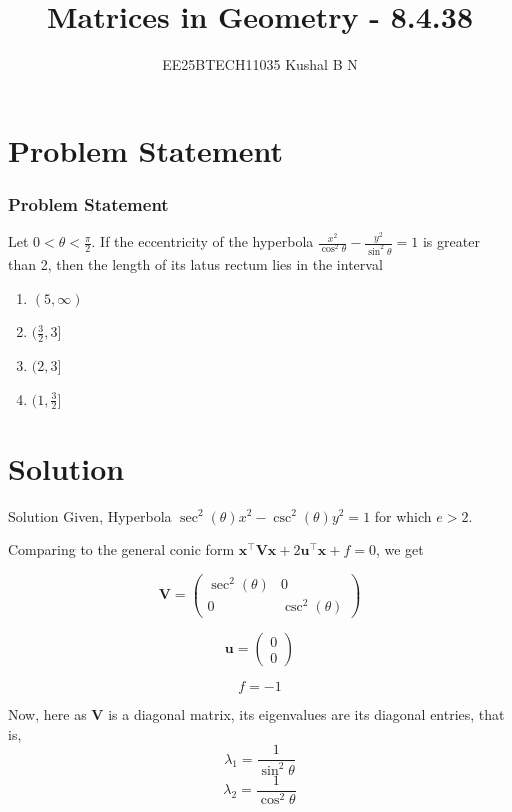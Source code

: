 \documentclass{beamer}
\title{Matrices in Geometry - 8.4.38}
\author{EE25BTECH11035  Kushal B N}
\date{}
\let\vec\mathbf
\theoremstyle{remark}
\newcommand{\myvec}[1]{\ensuremath{\begin{pmatrix}#1\end{pmatrix}}}
\begin{document}
\maketitle

\section{Problem Statement}
\begin{frame}
\frametitle{Problem Statement}
Let $0 < \theta < \frac{\pi}{2}$. If the eccentricity of the hyperbola $\frac{x^2}{\cos^2{\theta}} - \frac{y^2}{\sin^2{\theta}} = 1$ is greater than 2, then the length of its latus rectum lies in the interval
\begin{enumerate}
    \item $(5,\infty)$
    \item $(\frac{3}{2},3 ]$
    \item $(2,3]$
    \item $(1,\frac{3}{2}]$
\end{enumerate}
\end{frame}

\section{Solution}
\begin{frame}{Solution}
Given,
Hyperbola $\sec^2(\theta)x^2 - \csc^2(\theta)y^2 = 1$ for which $e>2$.

Comparing to the general conic form $\vec{x}^{\top}\vec{V}\vec{x} + 2\vec{u}^{\top}\vec{x} + f = 0$, we get

\begin{equation}
    \vec{V} = \myvec{\sec^2(\theta) & 0\\0 & \csc^2(\theta)}
\end{equation}

\begin{equation}
    \vec{u} = \myvec{0\\0}
\end{equation}

\begin{equation}
    f = -1
\end{equation}

Now, here as $\vec{V}$ is a diagonal matrix, its eigenvalues are its diagonal entries, that is,
\begin{equation}
    \lambda_1 = \frac{1}{\sin^2{\theta}}
\end{equation}
\begin{equation}
    \lambda_2 = \frac{1}{\cos^2{\theta}}
\end{equation}
\end{frame}
\end{document}
